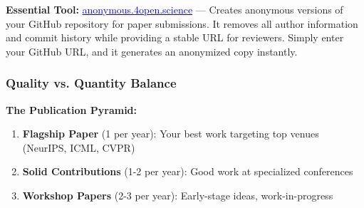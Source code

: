 \documentclass[11pt,a4paper]{article}
\begin{document}
\begin{tcolorbox}[colback=green!5,colframe=green!50,title={\faUserSecret~Code Anonymization for Double-Blind Review}]
\textbf{Essential Tool:} \href{https://anonymous.4open.science/}{\textcolor{blue}{anonymous.4open.science}} — Creates anonymous versions of your GitHub repository for paper submissions. It removes all author information and commit history while providing a stable URL for reviewers. Simply enter your GitHub URL, and it generates an anonymized copy instantly.
\end{tcolorbox}

\subsubsection{Quality vs. Quantity Balance}

\textbf{The Publication Pyramid:}
\begin{enumerate}
    \item \textbf{Flagship Paper} (1 per year): Your best work targeting top venues (NeurIPS, ICML, CVPR)
    \item \textbf{Solid Contributions} (1-2 per year): Good work at specialized conferences
    \item \textbf{Workshop Papers} (2-3 per year): Early-stage ideas, work-in-progress
\end{enumerate}
\end{document}
